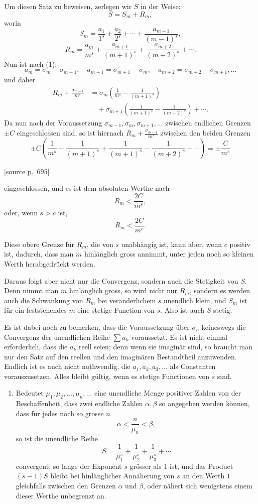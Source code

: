 \documentclass[11pt]{article}
\newcommand{\srcpage}[1]{\par\medskip\noindent\textsf{[source p.~#1]}\par\smallskip}
\begin{document}
Um diesen Satz zu beweisen, zerlegen wir $S$ in der Weise:
\[
S=S_m+R_m,
\]
worin
\[
S_m=\frac{a_1}{1^s}+\frac{a_2}{2^s}+\cdots+\frac{a_{m-1}}{(m-1)^s},
\]
\[
R_m=\frac{a_m}{m^s}+\frac{a_{m+1}}{(m+1)^s}+\frac{a_{m+2}}{(m+2)^s}+\cdots .
\]
Nun ist nach (1):
\[
a_m=\sigma_m-\sigma_{m-1},\quad a_{m+1}=\sigma_{m+1}-\sigma_m,\quad
a_{m+2}=\sigma_{m+2}-\sigma_{m+1},\ldots
\]
und daher
\[
\begin{aligned}
R_m+\frac{\sigma_{m-1}}{m^s}
&=\sigma_m\left(\frac1{m^s}-\frac1{(m+1)^s}\right)\\
&\quad+\sigma_{m+1}\left(\frac1{(m+1)^s}-\frac1{(m+2)^s}\right)+\cdots .
\end{aligned}
\]
Da nun nach der Voraussetzung $\sigma_{m-1},\sigma_m,\sigma_{m+1},\ldots$ zwischen endlichen Grenzen $\pm C$ eingeschlossen sind, so ist hiernach $R_m+\frac{\sigma_{m-1}}{m^s}$ zwischen den beiden Grenzen
\[
\pm C\left(\frac1{m^s}-\frac1{(m+1)^s}+\frac1{(m+1)^s}-\frac1{(m+2)^s}+\cdots\right)
=\pm\frac{C}{m^s}
\]

\srcpage{695}
eingeschlossen, und es ist dem absoluten Werthe nach
\[
R_m<\frac{2C}{m^s},
\]
oder, wenn $s>c$ ist,
\[
R_m<\frac{2C}{m^c}.
\]

Diese obere Grenze für $R_m$, die von $s$ unabhängig ist, kann aber, wenn $c$ positiv ist, dadurch, dass man $m$ hinlänglich gross annimmt, unter jeden noch so kleinen Werth herabgedrückt werden.

Daraus folgt aber nicht nur die Convergenz, sondern auch die Stetigkeit von $S$. Denn nimmt man $m$ hinlänglich gross, so wird nicht nur $R_m$, sondern es werden auch die Schwankung von $R_m$ bei veränderlichem $s$ unendlich klein, und $S_m$ ist für ein feststehendes $m$ eine stetige Function von $s$. Also ist auch $S$ stetig.

Es ist dabei noch zu bemerken, dass die Voraussetzung über $\sigma_n$ keineswegs die Convergenz der unendlichen Reihe $\sum a_k$ voraussetzt. Es ist nicht einmal erforderlich, dass die $a_k$ reell seien; denn wenn sie imaginär sind, so braucht man nur den Satz auf den reellen und den imaginären Bestandtheil anzuwenden. Endlich ist es auch nicht nothwendig, die $a_1,a_2,a_3,\ldots$ als Constanten vorauszusetzen. Alles bleibt gültig, wenn es stetige Functionen von $s$ sind.

\begin{enumerate}[label=\textbf{\arabic*.},leftmargin=2.2em,start=2]
\item Bedeutet $\mu_1,\mu_2,\ldots,\mu_n,\ldots$ eine unendliche Menge positiver Zahlen von der Beschaffenheit, dass zwei endliche Zahlen $\alpha,\beta$ so angegeben werden können, dass für jedes noch so grosse $n$
\begin{equation}
\alpha<\frac{n}{\mu_n}<\beta,
\tag{3}
\end{equation}
so ist die unendliche Reihe
\[
S=\frac1{\mu_1^s}+\frac1{\mu_2^s}+\frac1{\mu_3^s}+\cdots
\]
convergent, so lange der Exponent $s$ grösser als $1$ ist, und das Product $(s-1)S$ bleibt bei hinlänglicher Annäherung von $s$ an den Werth $1$ gleichfalls zwischen den Grenzen $\alpha$ und $\beta$, oder nähert sich wenigstens einem dieser Werthe unbegrenzt an.
\end{enumerate}
\end{document}
